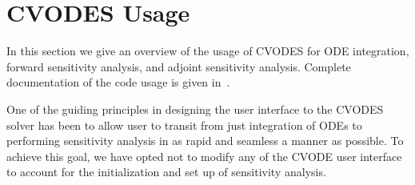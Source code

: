 \section{CVODES Usage}\label{s:usage}

In this section we give an overview of the usage of CVODES for ODE integration, 
forward sensitivity analysis, and adjoint sensitivity analysis. 
Complete documentation of the code usage is given in~\cite{HiSe:04cvodes}.

%
One of the guiding principles in designing the user interface to the 
CVODES solver has been to allow user to transit from just integration 
of ODEs to performing sensitivity analysis in as rapid and seamless a 
manner as possible. To achieve this goal, we have opted not to 
modify any of the CVODE user interface to account for the initialization
and set up of sensitivity analysis.

